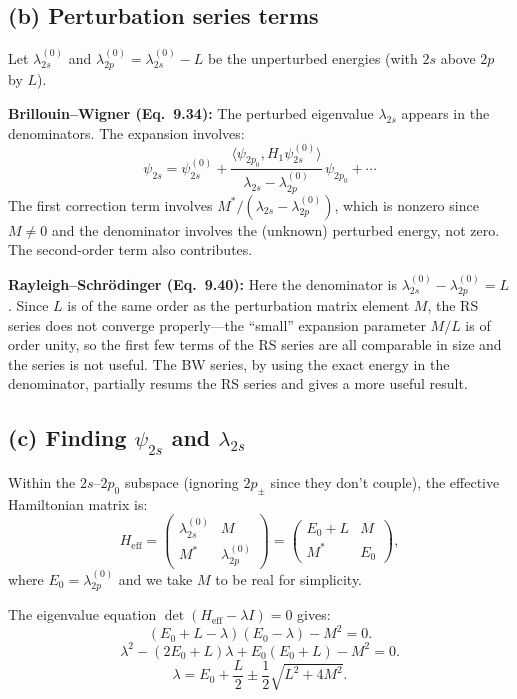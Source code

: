 \documentclass[12pt]{article}
\begin{document}
\subsection*{(b) Perturbation series terms}

Let $\lambda_{2s}^{(0)}$ and $\lambda_{2p}^{(0)} = \lambda_{2s}^{(0)} - L$ be the unperturbed energies (with $2s$ above $2p$ by $L$).

\textbf{Brillouin--Wigner (Eq.~9.34):} The perturbed eigenvalue $\lambda_{2s}$ appears in the denominators. The expansion involves:
\[
\psi_{2s} = \psi_{2s}^{(0)} + \frac{\langle\psi_{2p_0}, H_1\psi_{2s}^{(0)}\rangle}{\lambda_{2s} - \lambda_{2p}^{(0)}}\,\psi_{2p_0} + \cdots
\]
The first correction term involves $M^*/(\lambda_{2s} - \lambda_{2p}^{(0)})$, which is nonzero since $M \neq 0$ and the denominator involves the (unknown) perturbed energy, not zero. The second-order term also contributes.

\textbf{Rayleigh--Schr\"odinger (Eq.~9.40):} Here the denominator is $\lambda_{2s}^{(0)} - \lambda_{2p}^{(0)} = L$. Since $L$ is of the same order as the perturbation matrix element $M$, the RS series does not converge properly---the ``small'' expansion parameter $M/L$ is of order unity, so the first few terms of the RS series are all comparable in size and the series is not useful. The BW series, by using the exact energy in the denominator, partially resums the RS series and gives a more useful result.

\subsection*{(c) Finding $\psi_{2s}$ and $\lambda_{2s}$}

Within the $2s$--$2p_0$ subspace (ignoring $2p_{\pm}$ since they don't couple), the effective Hamiltonian matrix is:
\[
H_{\text{eff}} = \begin{pmatrix} \lambda_{2s}^{(0)} & M \\ M^* & \lambda_{2p}^{(0)} \end{pmatrix} = \begin{pmatrix} E_0 + L & M \\ M^* & E_0 \end{pmatrix},
\]
where $E_0 = \lambda_{2p}^{(0)}$ and we take $M$ to be real for simplicity.

The eigenvalue equation $\det(H_{\text{eff}} - \lambda I) = 0$ gives:
\[
(E_0 + L - \lambda)(E_0 - \lambda) - M^2 = 0.
\]
\[
\lambda^2 - (2E_0 + L)\lambda + E_0(E_0 + L) - M^2 = 0.
\]
\[
\lambda = E_0 + \frac{L}{2} \pm \frac{1}{2}\sqrt{L^2 + 4M^2}.
\]
\end{document}
